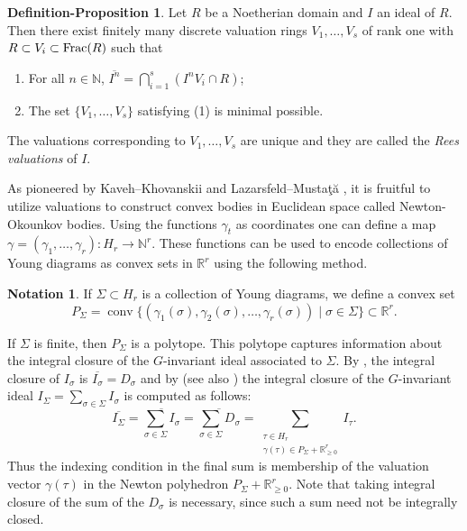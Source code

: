 \documentclass[11pt, reqno]{amsart}
\numberwithin{equation}{section}
\theoremstyle{definition}
\newtheorem{def-prop}[theorem]{Definition-Proposition}
\newtheorem{notation}[theorem]{Notation}
\newcommand{\NN}{{\mathbb N}}
\newcommand{\RR}{{\mathbb R}}
\newcommand{\s}{\sigma}
\begin{document}
\begin{def-prop}\label{def: Rees_valuations}
Let $R$ be a Noetherian domain and $I$ an ideal of $R$. Then there exist finitely many discrete valuation rings $V_1 ,\ldots , V_s$ of rank one with $R\subset V_i \subset {\rm Frac}(R)$ such that
\begin{enumerate}
\item For all $n\in \NN$, $\overline{I^n}=\bigcap_{i=1}^s (I^nV_i\cap R)$;
\item The set $\{V_1,\ldots ,V_s\}$ satisfying (1) is minimal possible.
\end{enumerate}
The  valuations corresponding to $V_1, \ldots, V_s$ are unique and they are called the {\em Rees valuations} of $I$.
\end{def-prop}

As pioneered by Kaveh--Khovanskii \cite{KAVEH_KHOVANSKII} and Lazarsfeld--Musta\c{t}\u{a} \cite{lazarsfeld09}, it is fruitful to utilize valuations to construct convex bodies in Euclidean space called Newton-Okounkov bodies.
Using the functions $\gamma_t$ as coordinates one can define a map $\gamma=(\gamma_1, \ldots, \gamma_r):H_r\to \NN^r$. These functions can be used to encode collections of Young diagrams as convex sets in $\RR^r$ using the following method.

\begin{notation}\label{not: P_sigma}
If $\Sigma\subset H_r$ is a collection of Young diagrams, we define a convex set
\[
P_\Sigma=\operatorname{conv}\bigl\{(\gamma_1(\sigma),\gamma_2(\sigma),\ldots,\gamma_r(\sigma))
\mid \sigma\in\Sigma\bigr\}\subset \mathbb{R}^r.
\]
\end{notation}

If $\Sigma$ is finite, then $P_\Sigma$ is a polytope. This polytope captures information about the integral closure of the $G$-invariant ideal associated to $\Sigma$.
By  \cite[Theorem 8.1]{deconcini1980young},
 the integral closure of $I_\s$ is $\overline{I_\s}=D_\s$ and by  \cite[Theorem 8.2]{deconcini1980young} (see also \cite[Theorem 2.3]{HV})
 the integral closure of the $G$-invariant ideal $I_\Sigma=\sum_{ \s\in \Sigma} I_\s$ is computed as follows:
\begin{equation}\label{eq: integral closure}
\overline{I_\Sigma}
=\overline{\sum_{\sigma\in\Sigma}I_\sigma}
=\overline{\sum_{\sigma\in\Sigma}D_\sigma}
=\sum_{\substack{\tau\in H_r\\
\gamma(\tau)\in P_\Sigma+\RR_{\geq0}^r}}I_\tau.
\end{equation}
Thus the indexing condition in the final sum is membership of the valuation vector $\gamma(\tau)$ in the Newton polyhedron $P_\Sigma+\RR_{\geq0}^r$. Note that taking integral closure of the sum of the $D_\sigma$ is necessary, since such a sum need not be integrally closed.
\end{document}
